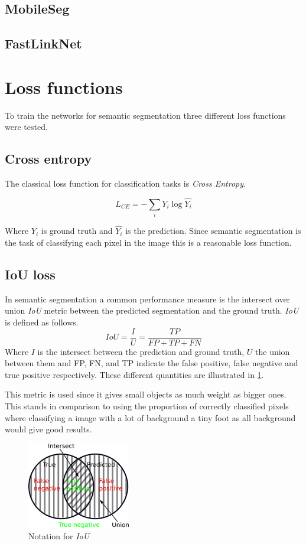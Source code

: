 \documentclass{kththesis}
\begin{document}
\subsection{MobileSeg}

\subsection{FastLinkNet}

\section{Loss functions}
To train the networks for semantic segmentation three different loss functions
were tested.

\subsection{Cross entropy}
The classical loss function for classification  tasks is
\textit{Cross Entropy}.

\[L_{CE} = - \sum_i Y_i \log\hat{Y_i}\]

Where \(Y_i\) is ground truth and \(\hat{Y_i}\) is the prediction. Since
semantic segmentation is the task of classifying each pixel in the image this is
a reasonable loss function.

\subsection{IoU loss}
In semantic segmentation a common performance measure is the intersect over union
\textit{IoU} metric between the predicted segmentation and the ground truth.
\textit{IoU} is defined as follows.
\[IoU = \frac{I}{U} = \frac{\textit{TP}}{\textit{FP} + \textit{TP} + \textit{FN}}\]
Where \(I\) is the intersect between the prediction and ground truth, \(U\) the union
between them and FP, FN, and TP indicate the false positive, false negative and
true positive respectively. These different quantities are illustrated in \cref{fig:IoU}.

This metric is used since it gives small objects as much weight as bigger ones.
This stands in comparison to using the proportion of correctly classified pixels
where classifying a image with a lot of background a tiny foot as all background
would give good results.

\begin{figure}[h]
  \centering
  \includegraphics[width=0.40\textwidth]{IoU}
  \caption{Notation for \textit{IoU}}
  \label{fig:IoU}
\end{figure}
\end{document}
